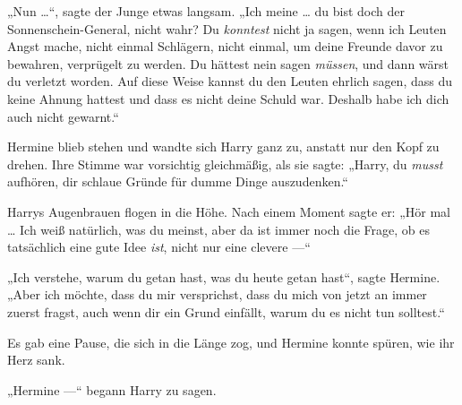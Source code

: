 „Nun …“, sagte der Junge etwas langsam.
„Ich meine … du bist doch der Sonnenschein-General, nicht wahr? Du \emph{konntest} nicht ja sagen, wenn ich Leuten Angst mache, nicht einmal Schlägern, nicht einmal, um deine Freunde davor zu bewahren, verprügelt zu werden. Du hättest nein sagen \emph{müssen}, und dann wärst du verletzt worden. Auf diese Weise kannst du den Leuten ehrlich sagen, dass du keine Ahnung hattest und dass es nicht deine Schuld war. Deshalb habe ich dich auch nicht gewarnt.“

Hermine blieb stehen und wandte sich Harry ganz zu, anstatt nur den Kopf zu drehen. Ihre Stimme war vorsichtig gleichmäßig, als sie sagte:
„Harry, du \emph{musst} aufhören, dir schlaue Gründe für dumme Dinge auszudenken.“

Harrys Augenbrauen flogen in die Höhe. Nach einem Moment sagte er:
„Hör mal … Ich weiß natürlich, was du meinst, aber da ist immer noch die Frage, ob es tatsächlich eine gute Idee \emph{ist}, nicht nur eine clevere —“

„Ich verstehe, warum du getan hast, was du heute getan hast“, sagte Hermine.
„Aber ich möchte, dass du mir versprichst, dass du mich von jetzt an immer zuerst fragst, auch wenn dir ein Grund einfällt, warum du es nicht tun solltest.“

Es gab eine Pause, die sich in die Länge zog, und Hermine konnte spüren, wie ihr Herz sank.

„Hermine —“ begann Harry zu sagen.

